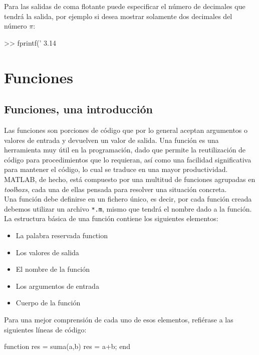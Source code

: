 Para las salidas de coma flotante puede especificar el número de
decimales que tendrá la salida, por ejemplo si desea mostrar solamente
dos decimales del número $\pi$:

\begin{matlab}
>> fprintf('%
3.14
\end{matlab}

\section{Funciones}\label{funciones}

\subsection{Funciones, una introducción}\label{funciones-una-introduccion}

Las funciones son porciones de código que por lo general aceptan
argumentos o valores de entrada y devuelven un valor de salida. Una
función es una herramienta muy útil en la programación, dado que permite
la reutilización de código para procedimientos que lo requieran, así
como una facilidad significativa para mantener el código, lo cual se
traduce en una mayor productividad. MATLAB, de hecho, está compuesto por
una multitud de funciones agrupadas en \emph{toolboxs}, cada una de
ellas pensada para resolver una situación concreta.\\

Una función debe definirse en un fichero único, es decir, por cada
función creada debemos utilizar un archivo \texttt{*.m}, mismo que
tendrá el nombre dado a la función.\\

La estructura básica de una función contiene los siguientes elementos:

\begin{itemize}
\tightlist
\item
  La palabra reservada function
\item
  Los valores de salida
\item
  El nombre de la función
\item
  Los argumentos de entrada
\item
  Cuerpo de la función
\end{itemize}

Para una mejor comprensión de cada uno de esos elementos, refiérase a
las siguientes líneas de código:

\begin{matlab}
function res = suma(a,b)
res = a+b;
end
\end{matlab}

